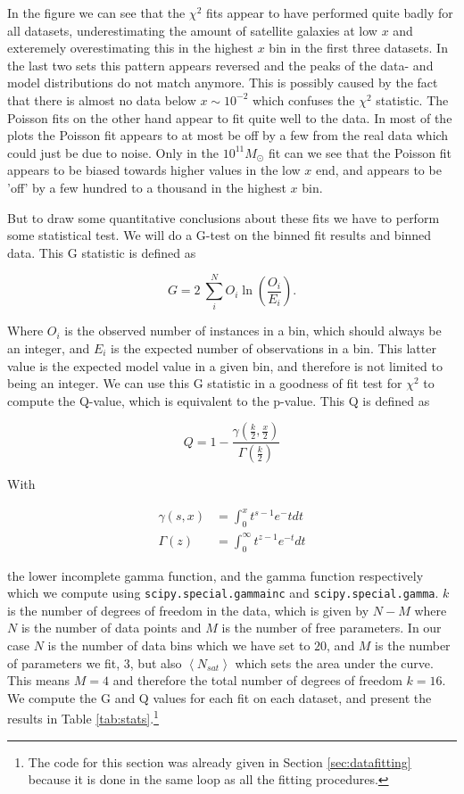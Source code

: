 In the figure we can see that the $\chi^2$ fits appear to have performed quite badly for all datasets, underestimating the amount of satellite galaxies at low $x$ and exteremely overestimating this in the highest $x$ bin in the first three datasets. In the last two sets this pattern appears reversed and the peaks of the data- and model distributions do not match anymore. This is possibly caused by the fact that there is almost no data below $x \sim 10^{-2}$ which confuses the $\chi^2$ statistic. The Poisson fits on the other hand appear to fit quite well to the data. In most of the plots the Poisson fit appears to at most be off by a few from the real data which could just be due to noise. Only in the $10^{11} M_{\odot}$ fit can we see that the Poisson fit appears to be biased towards higher values in the low $x$ end, and appears to be 'off' by a few hundred to a thousand in the highest $x$ bin. 



But to draw some quantitative conclusions about these fits we have to perform some statistical test. We will do a G-test on the binned fit results and binned data. This G statistic is defined as

\begin{equation}
    G = 2~\sum_i^N O_i\ln\left(\frac{O_i}{E_i}\right)\label{eq:G}.
\end{equation}

Where $O_i$ is the observed number of instances in a bin, which should always be an integer, and $E_i$ is the expected number of observations in a bin. This latter value is the expected model value in a given bin, and therefore is not limited to being an integer. We can use this G statistic in a goodness of fit test for $\chi^2$ to compute the Q-value, which is equivalent to the p-value. This Q is defined as

\begin{equation}
    Q = 1 - \frac{\gamma\left(\frac{k}{2},\frac{x}{2}\right)}{\Gamma\left(\frac{k}{2}\right)}\label{eq:Q}
\end{equation}

With 

\begin{align}
    \gamma(s, x) &= \int_0^x t^{s-1}e^-t dt \\
    \Gamma(z) &= \int_0^{\infty} t^{z-1}e^{-t}dt
\end{align}

the lower incomplete gamma function, and the gamma function respectively which we compute using \texttt{scipy.special.gammainc} and \texttt{scipy.special.gamma}. $k$ is the number of degrees of freedom in the data, which is given by $N - M$ where $N$ is the number of data points and $M$ is the number of free parameters. In our case $N$ is the number of data bins which we have set to $20$, and $M$ is the number of parameters we fit, 3, but also $\left<N_{sat}\right>$ which sets the area under the curve. This means $M=4$ and therefore the total number of degrees of freedom $k = 16$. We compute the G and Q values for each fit on each dataset, and present the results in Table \ref{tab:stats}.\footnote{The code for this section was already given in Section \ref{sec:datafitting} because it is done in the same loop as all the fitting procedures.}

